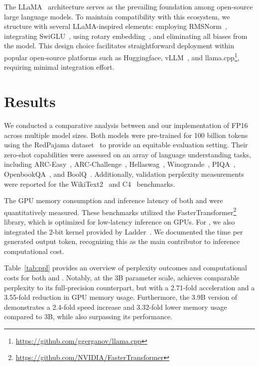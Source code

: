 The LLaMA~\cite{llama, llama2} architecture serves as the prevailing foundation among open-source large language models. To maintain compatibility with this ecosystem, we structure  with several LLaMA-inspired elements: employing RMSNorm~\cite{rmsnorm}, integrating SwiGLU~\cite{swiglu}, using rotary embedding~\cite{rope}, and eliminating all biases from the model. This design choice facilitates straightforward deployment within popular open-source platforms such as Huggingface, vLLM~\cite{vllm}, and llama.cpp\footnote{\url{https://github.com/ggerganov/llama.cpp}}, requiring minimal integration effort.

\section{Results}

We conducted a comparative analysis between  and our implementation of FP16  across multiple model sizes. Both models were pre-trained for 100 billion tokens using the RedPajama dataset~\cite{redpajama} to provide an equitable evaluation setting. Their zero-shot capabilities were assessed on an array of language understanding tasks, including ARC-Easy~\cite{arc}, ARC-Challenge~\cite{arc}, Hellaswag~\cite{hellaswag}, Winogrande~\cite{winoGrande}, PIQA~\cite{piqa}, OpenbookQA~\cite{openbookqa}, and BoolQ~\cite{boolq}. Additionally, validation perplexity measurements were reported for the WikiText2~\cite{wikitext2} and C4~\cite{c4} benchmarks.

The GPU memory consumption and inference latency of both  and  were quantitatively measured. These benchmarks utilized the FasterTransformer\footnote{\url{https://github.com/NVIDIA/FasterTransformer}} library, which is optimized for low-latency inference on GPUs. For , we also integrated the 2-bit kernel provided by Ladder~\cite{ladder}. We documented the time per generated output token, recognizing this as the main contributor to inference computational cost.

Table~\ref{tab:ppl} provides an overview of perplexity outcomes and computational costs for both  and . Notably, at the 3B parameter scale,  achieves comparable perplexity to its full-precision  counterpart, but with a 2.71-fold acceleration and a 3.55-fold reduction in GPU memory usage. Furthermore, the 3.9B version of  demonstrates a 2.4-fold speed increase and 3.32-fold lower memory usage compared to  3B, while also surpassing its performance.

